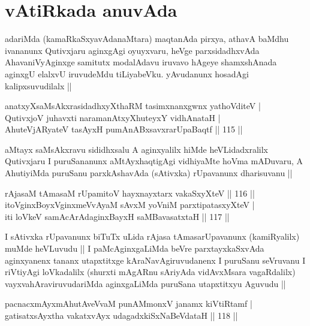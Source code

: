 \section*{vAtiRkada anuvAda}

\begin{artha}
adariMda (kamaRkaSxyavAdanaMtara) maqtanAda pirxya, athavA baMdhu
ivananunx Qutivxjaru aginxgAgi oyuyxvaru, heVge parxsidadhxvAda
AhavaniVyAginxge samitutx modalAdavu iruvavo hAgeye shamxshAnada
aginxgU elalxvU iruvudeMdu tiLiyabeVku. yAvudanunx hosadAgi
kalipxsuvudilalx ||
\end{artha}

\begin{shl}
anatxyXsaMsAkxrasidadhxyXthaRM tasimxnanxgwnx yathoVditeV | \\
QutivxjoV juhavxti naramanAtxyXhuteyxY vidhAnataH | \\
AhuteVjARyateV tasAyxH pumAnABxsavxrarUpaBaqtf \hfill|| 115 || 
\end{shl}

\begin{artha}
aMtayx saMsAkxravu sididhxsalu A aginxyalilx hiMde heVLidadxralilx
Qutivxjaru I puruSananunx aMtAyxhaqtigAgi vidhiyaMte hoVma mADuvaru, A
AhutiyiMda puruSanu parxkAshavAda (sAtivxka) rUpavanunx dharisuvanu ||
\end{artha}

\begin{shl}
rAjasaM tAmasaM rUpamitoV hayxnayxtarx vakaSxyXteV \hfill|| 116 || \\
itoV\s ginxBoyxV\s ginxmeVvAyaM sAvxM yoVniM parxtipatasxyXteV | \\
iti loVkeV samAcArAdaginxBayxH saMBavasatxtaH \hfill|| 117 || 
\end{shl}

\begin{artha}
I sAtivxka rUpavanunx biTuTx uLida rAjasa tAmasarUpavanunx
(kamiRyalilx) muMde heVLuvudu || I paMcAginxgaLiMda beVre
parxtayxkaSxvAda aginxyanenx tananx utapxtitxge kAraNavAgiruvudanenx I
puruSanu seVruvanu I riVtiyAgi loVkadalilx (shurxti mAgARnu sAriyAda
vidAvxMsara vagaRdalilx) vayxvahAraviruvudariMda aginxgaLiMda puruSana
utapxtitxyu Aguvudu ||
\end{artha}


\begin{shl}
pacnacxmAyxmAhutAveVvaM punAMmonxV janamx kiVtiRtamf | \\
gatisatxsAyxtha vakatxvAyx udagadxkiSxNaBeVdataH \hfill|| 118 || 
\end{shl}

